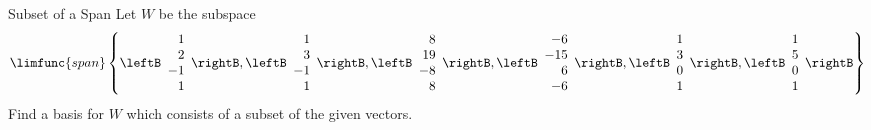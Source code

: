 \begin{example}{Subset of a Span}\label{exa:subsetbasis}
Let $W$ be the subspace 
\begin{equation*}
\limfunc{span}\left\{ \leftB 
\begin{array}{r}
1 \\ 
2 \\ 
-1 \\ 
1
\end{array}
\rightB ,\leftB 
\begin{array}{r}
1 \\ 
3 \\ 
-1 \\ 
1
\end{array}
\rightB ,\leftB 
\begin{array}{r}
8 \\ 
19 \\ 
-8 \\ 
8
\end{array}
\rightB ,\leftB 
\begin{array}{r}
-6 \\ 
-15 \\ 
6 \\ 
-6
\end{array}
\rightB ,\leftB 
\begin{array}{r}
1 \\ 
3 \\ 
0 \\ 
1
\end{array}
\rightB ,\leftB 
\begin{array}{r}
1 \\ 
5 \\ 
0 \\ 
1
\end{array}
\rightB \right\}
\end{equation*}
Find a basis for $W$ which consists of a subset of the given vectors.
\end{example}

